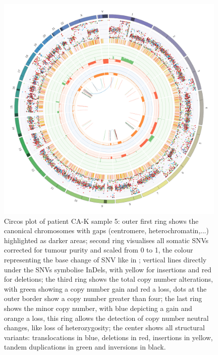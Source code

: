 \begin{figure}[ht]
\centering
\includegraphics[width=.99\linewidth]{Figures/CASCADE/CA82/CA82-5.circos.png}
\caption[Circos plot of patient CA-K sample 5]{Circos plot of patient CA-K sample 5: outer first ring shows the canonical chromosomes with gaps (centromere, heterochromatin,...) highlighted as darker areas; second ring visualises all somatic SNVs corrected for tumour purity and scaled from 0 to 1, the colour representing the base change of SNV like in \protect\textcite{Alexandrov2013}; vertical lines directly under the SNVs symbolise InDels, with yellow for insertions and red for deletions; the third ring shows the total copy number alterations, with green showing a copy number gain and red a loss, dots at the outer border show a copy number greater than four; the last ring shows the minor copy number, with blue depicting a gain and orange a loss, this ring allows the detection of copy number neutral changes, like loss of heterozygosity; the center shows all structural variants: translocations in blue, deletions in red, insertions in yellow, tandem duplications in green and inversions in black.} \label{fig:ca82.5circos}
\end{figure}

